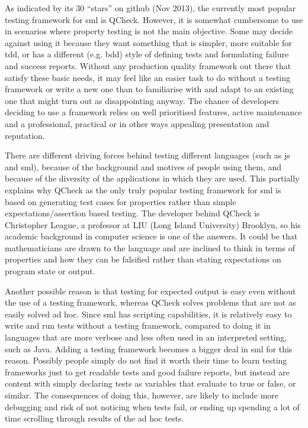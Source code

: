 \documentclass[11pt]{article}
\begin{document}
As indicated by its 30 ``stars'' on github (Nov 2013), the currently most popular testing framework for \gls{sml} is QCheck. However, it is somewhat cumbersome to use in scenarios where property testing is not the main objective. Some may decide against using it because they want something that is simpler, more suitable for \gls{tdd}, or has a different (e.g. \gls{bdd}) style of defining tests and formulating failure and success reports. Without any production quality framework out there that satisfy these basic needs, it may feel like an easier task to do without a testing framework or write a new one than to familiarise with and adapt to an existing one that might turn out as disappointing anyway. The chance of developers deciding to use a framework relies on well prioritised features, active maintenance and a professional, practical or in other ways appealing presentation and reputation.

There are different driving forces behind testing different languages (such as \gls{js} and \gls{sml}), because of the background and motives of people using them, and because of the diversity of the applications in which they are used. This partially explains why QCheck as the only truly popular testing framework for \gls{sml} is based on generating test cases for properties rather than simple expectations/assertion based testing. The developer behind QCheck is Christopher League, a professor at LIU (Long Island University) Brooklyn, so his academic background in computer science is one of the answers. It could be that mathematicians are drawn to the language and are inclined to think in terms of properties and how they can be falsified rather than stating expectations on program state or output.

Another possible reason is that testing for expected output is easy even without the use of a testing framework, whereas QCheck solves problems that are not as easily solved ad hoc. Since \gls{sml} has scripting capabilities, it is relatively easy to write and run tests without a testing framework, compared to doing it in languages that are more verbose and less often used in an interpreted setting, such as Java. Adding a testing framework becomes a bigger deal in \gls{sml} for this reason. Possibly people simply do not find it worth their time to learn testing frameworks just to get readable tests and good failure reports, but instead are content with simply declaring tests as variables that evaluate to true or false, or similar. The consequences of doing this, however, are likely to include more debugging and risk of not noticing when tests fail, or ending up spending a lot of time scrolling through results of the ad hoc tests.
\end{document}
